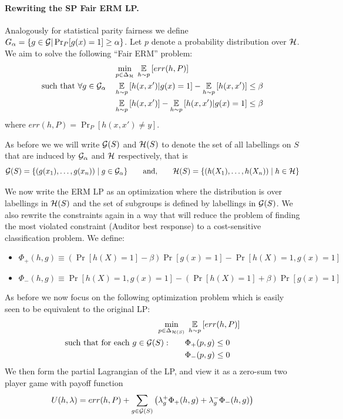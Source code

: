 \paragraph{Rewriting the SP Fair ERM LP.}
Analogously for statistical parity fairness we define $G_{\alpha} = \{g \in \mathcal{G} | \Pr_{P}[g(x) = 1] \geq \alpha \}$. Let $p$ denote a probability distribution over
$\mathcal{H}$. We aim to solve the following ``Fair ERM'' problem:
\begin{align}
  &  \min_{p\in \Delta_{\mathcal{H}}}\; \operatorname*{\mathbb{E}}_{h\sim p}\left[err(h, P)\right]\\
  \mbox{such that } \forall g\in \mathcal{G}_\alpha \quad &  \operatorname*{\mathbb{E}}_{h\sim p}\left[h(x,x')|g(x) =1\right] - \operatorname*{\mathbb{E}}_{h\sim p}\left[h(x,x')\right] \leq \beta \label{fair1}\\
&  \operatorname*{\mathbb{E}}_{h\sim p}\left[h(x,x')\right] - \operatorname*{\mathbb{E}}_{h\sim p}\left[h(x,x')|g(x) =1\right] \leq \beta \label{fair2}
\end{align}
where $err(h, P) = \Pr_P[h(x, x') \neq y]$.



As before we we will write $\mathcal{G}(S)$ and $\mathcal{H}(S)$
to denote the set of all labellings on $S$ that are induced by $\mathcal{G}_\alpha$
and $\mathcal{H}$ respectively, that is
\[
  \mathcal{G}(S) = \{(g(x_1), \ldots , g(x_n)) \mid g\in \mathcal{G}_\alpha\} \qquad
  \mbox{and,} \qquad \mathcal{H}(S) = \{(h(X_1), \ldots , h(X_n))\mid h\in
  \mathcal{H}\}
\]

We now write the ERM LP as an optimization where the distribution is
over labellings in $\mathcal{H}(S)$ and the set of subgroups is defined by labellings
in $\mathcal{G}(S)$. We also rewrite the constraints again in a way that will reduce
the problem of finding the most violated constraint (Auditor best response) to
a cost-sensitive classification problem. We define:
\begin{itemize}
\item $\Phi_+(h,g) \equiv (\Pr[h(X) =1]-\beta)\Pr[g(x) =1]-\Pr[h(X)=1,g(x)=1]$
\item $\Phi_-(h,g) \equiv  \Pr[h(X) = 1, g(x) = 1] - \left(\Pr[h(X)=1] + \beta\right)\Pr[g(x) = 1]$
\end{itemize}

As before we now focus on the following optimization problem which is easily seen to be equivalent to the original LP:
\begin{align}
    \min_{p\in \Delta_{\mathcal{H}(S)}} & \; \operatorname*{\mathbb{E}}_{h\sim p}\left[err(h, P)\right]   \\ \mbox{such that for each }  g\in \mathcal{G}(S):\qquad
  & \Phi_+(p, g)\leq 0 \label{sp1}\\
  & \Phi_-(p,g) \leq 0 \label{sp2}
\end{align}
We then form the partial Lagrangian of the LP, and view it as a zero-sum two player game with payoff function
\[
  U(h, \lambda) = err(h, P) + \sum_{g\in \mathcal{G}(S)}
  \left(\lambda_g^+\Phi_+(h, g) + \lambda_g^-\Phi_-(h, g) \right)
\]

